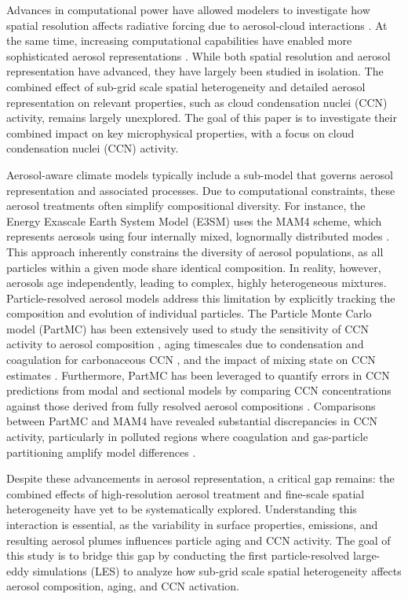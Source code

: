 \documentclass[acp]{copernicus}
\begin{document}
Advances in computational power have allowed modelers to investigate
how spatial resolution affects radiative forcing due to aerosol-cloud
interactions \citep{ma_how_2015}. At the same time, increasing
computational capabilities have enabled more sophisticated aerosol
representations \citep{zaveri_development_2021,
  tilmes_description_2023}. While both spatial resolution and aerosol
representation have advanced, they have largely been studied in
isolation. The combined effect of sub-grid scale spatial heterogeneity
and detailed aerosol representation on relevant properties, such as
cloud condensation nuclei (CCN) activity, remains largely unexplored.
The goal of this paper is to investigate their combined impact on key 
microphysical properties, with a focus on cloud condensation nuclei 
(CCN) activity.

Aerosol-aware climate models typically include a sub-model that
governs aerosol representation and associated processes. Due to
computational constraints, these aerosol treatments often simplify
compositional diversity. For instance, the Energy Exascale Earth
System Model (E3SM) uses the MAM4 scheme, which represents aerosols
using four internally mixed, lognormally distributed modes
\citep{golaz_doe_2022}. This approach inherently constrains the
diversity of aerosol populations, as all particles within a given mode
share identical composition. In reality, however, aerosols age
independently, leading to complex, highly heterogeneous
mixtures. Particle-resolved aerosol models address this limitation by
explicitly tracking the composition and evolution of individual
particles. The Particle Monte Carlo model (PartMC) \citep{riemer_simulating_2009} 
has been extensively used to study the sensitivity of
CCN activity to aerosol composition \citep{fierce_when_2013}, aging
timescales due to condensation and coagulation for carbonaceous CCN
\citep{fierce_explaining_2015}, and the impact of mixing state on CCN
estimates \citep{ching_metrics_2017}. Furthermore, PartMC has been
leveraged to quantify errors in CCN predictions from modal and
sectional models by comparing CCN concentrations against those derived
from fully resolved aerosol compositions
\citep{zaveri_particle-resolved_2010, ching_metrics_2017}. Comparisons
between PartMC and MAM4 have revealed substantial discrepancies in CCN
activity, particularly in polluted regions where coagulation and
gas-particle partitioning amplify model differences
\citep{fierce_quantifying_2024}.

Despite these advancements in aerosol representation, a critical gap
remains: the combined effects of high-resolution aerosol treatment and
fine-scale spatial heterogeneity have yet to be systematically
explored. Understanding this interaction is essential, as the
variability in surface properties, emissions, and resulting aerosol
plumes influences particle aging and CCN activity. The goal of this
study is to bridge this gap by conducting the first particle-resolved
large-eddy simulations (LES) to analyze how sub-grid scale spatial
heterogeneity affects aerosol composition, aging, and CCN activation.
\end{document}
